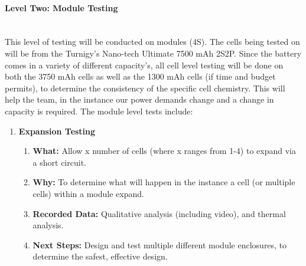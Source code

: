 \documentclass{report}
\let\oldparagraph\paragraph
\renewcommand{\paragraph}[1]{\oldparagraph{#1}\mbox{}\\}
\begin{document}
    \paragraph{Level Two: Module Testing}
    This level of testing will be conducted on modules (4S). The cells being tested on will be from the Turnigy’s Nano-tech Ultimate  7500 mAh 2S2P. Since the battery comes in a variety of different capacity’s, all cell level testing will be done on both the 3750 mAh cells as well as the 1300 mAh cells (if time and budget permits), to determine the consistency of the specific cell chemistry. This will help the team, in the instance our power demands change and a change in capacity is required. The module level tests include:
    \begin{enumerate}
        \item \textbf{Expansion Testing}
        \begin{enumerate}
            \item \textbf{What: }Allow x number of cells (where x ranges from 1-4) to expand via a short circuit.
            \item \textbf{Why: }To determine what will happen in the instance a cell (or multiple cells) within a module expand.
            \item \textbf{Recorded Data: }Qualitative analysis (including video), and thermal analysis.
            \item \textbf{Next Steps: }Design and test multiple different module enclosures, to determine the safest, effective design.
        \end{enumerate}
    \end{enumerate}
\end{document}
